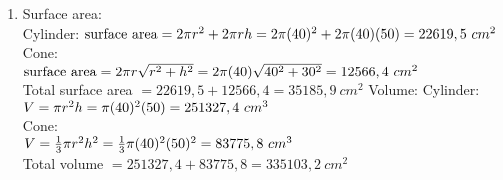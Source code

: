 \begin{eocsolutions}{}
{\begin{enumerate}[itemsep=5pt, label=\textbf{\arabic*}. ]
\begin{enumerate}[itemsep=5pt, label=\textbf{(\alph*)} ]
Square pyramid:\\
$V = \frac{1}{3} A \times h \\
= \frac{1}{3} (15)^2 \times 12 \\
= 900 ~cm^{3}$\\

Half sphere:\\
$V = \dfrac{(\frac{4}{3}\pi r^{3})}{2}\\
= \dfrac{(\frac{4}{3} \pi (4)^3)}{2}\\
= 134 ~cm^{3}$
      \end{enumerate}
\item Surface area:\\
Cylinder:
$\mbox{surface area} = 2 \pi r^2 + 2\pi rh\\
= 2 \pi(40)^2 + 2\pi(40)(50)\\
= 22619,5 ~cm^{2}$\\
Cone:\\
$\mbox{surface area} = 2 \pi r \sqrt{r^2 + h^2}\\
= 2 \pi (40) \sqrt{40^2 + 30^2} \\
= 12566,4 ~cm^{2}$\\
Total surface area $= 22619,5 + 12566,4 = 35185,9 ~cm^{2}$
Volume:
Cylinder:
$V =  \pi r^2 h\\
=  \pi(40)^2 (50)\\
= 251327,4 ~cm^{3}$\\
Cone:\\
$V = \frac{1}{3} \pi r^2 h^2\\
= \frac{1}{3} \pi (40)^2  (50)^2 \\
= 83775,8 ~cm^{3}$\\
Total volume $= 251327,4 + 83775,8 = 335103,2 ~cm^{2}$\\
\end{enumerate}}
\end{eocsolutions}


